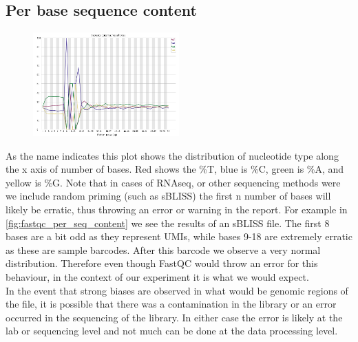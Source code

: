 \subsection{Per base sequence content \label{subsec:fastqc_seq_content}}
\begin{figure}
  \begin{center}
    \includegraphics[width=0.5\textwidth]{figures/FastQC_per_base_seq_content.png}
  \end{center}
  \label{fig:fastqc_per_seq_content}
\end{figure}
As the name indicates this plot shows the distribution of nucleotide type along the x axis of number of bases. Red shows the \%T, blue is \%C, green is \%A, and yellow is \%G. Note that in cases of RNAseq, or other sequencing methods were we include random priming (such as sBLISS) the first n number of bases will likely be erratic, thus throwing an error or warning in the report. For example in \autoref{fig:fastqc_per_seq_content} we see the results of an sBLISS file. The first 8 bases are a bit odd as they represent UMIs, while bases 9-18 are extremely erratic as these are sample barcodes. After this barcode we observe a very normal distribution. Therefore even though FastQC would throw an error for this behaviour, in the context of our experiment it is what we would expect.\\
In the event that strong biases are observed in what would be genomic regions of the file, it is possible that there was a contamination in the library or an error occurred in the sequencing of the library. In either case the error is likely at the lab or sequencing level and not much can be done at the data processing level.

